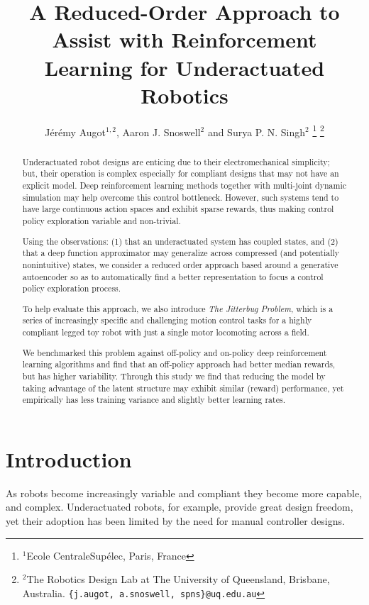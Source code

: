 \documentclass[letterpaper, 10 pt, conference]{ieeeconf}
\title{
    \LARGE \bf%
    A Reduced-Order Approach to Assist with Reinforcement Learning for Underactuated Robotics
}
\author{
    J\'er\'emy Augot$^{1,2}$, Aaron J. Snoswell$^{2}$ and Surya P. N. Singh$^{2}$
    \thanks{
        $^{1}$Ecole CentraleSup\'elec, Paris, France
    }%
    \thanks{
        $^{2}$The Robotics Design Lab at The University of Queensland, Brisbane, Australia.  
        {\texttt{\{j.augot, a.snoswell, spns\}@uq.edu.au}}
    }%
}
\begin{document}
\maketitle
\thispagestyle{empty}
\pagestyle{empty}

\begin{abstract}

Underactuated robot designs are enticing due to their electromechanical simplicity; but, their operation is complex especially for compliant designs that may not have an explicit model.
Deep reinforcement learning methods together with multi-joint dynamic simulation may help overcome this control bottleneck.
However, such systems tend to have large continuous action spaces and exhibit sparse rewards, thus making control policy exploration variable and non-trivial.  

Using the observations: (1) that an underactuated system has coupled states, and (2) that a deep function approximator may generalize across compressed (and potentially nonintuitive) states, we consider a reduced order approach based around a generative autoencoder so as to automatically find a better representation to focus a control policy exploration process. 

To help evaluate this approach, we also introduce \emph{The Jitterbug Problem}, which is a series of increasingly specific and challenging motion control tasks for a highly compliant legged toy robot with just a single motor locomoting across a field.  

We benchmarked this problem against off-policy and on-policy deep reinforcement learning algorithms and find that an off-policy approach had better median rewards, but has higher variability. 
Through this study we find that reducing the model by taking advantage of the latent structure may exhibit similar (reward) performance, yet empirically has less training variance and slightly better learning rates.

\end{abstract}

\section{Introduction}

As robots become increasingly variable and compliant they become more capable, and complex.
Underactuated robots, for example, provide great design freedom, yet their adoption has been limited by the need for manual controller designs.
\end{document}
